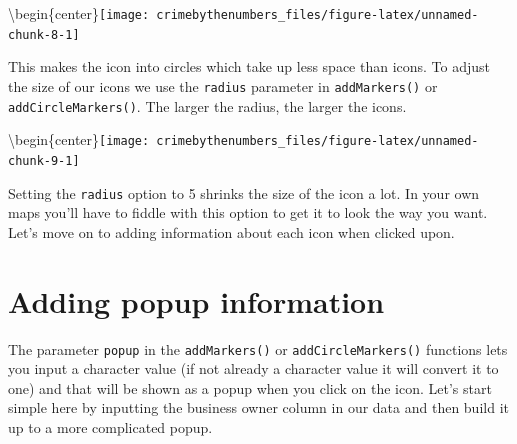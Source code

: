 \documentclass[
  12pt,
  openany]{book}
\newenvironment{Shaded}{\begin{snugshade}}{\end{snugshade}}
\newcommand{\AttributeTok}[1]{\textcolor[rgb]{0.61,0.61,0.61}{#1}}
\newcommand{\DecValTok}[1]{\textcolor[rgb]{0.06,0.06,0.06}{#1}}
\newcommand{\FunctionTok}[1]{\textcolor[rgb]{0,0,0}{#1}}
\newcommand{\NormalTok}[1]{#1}
\newcommand{\SpecialCharTok}[1]{\textcolor[rgb]{0,0,0}{#1}}
\newcommand{\StringTok}[1]{\textcolor[rgb]{0.5,0.5,0.5}{#1}}
\begin{document}
\textbackslash begin\{center\}\texttt{[image: crimebythenumbers\_files/figure-latex/unnamed-chunk-8-1]}

This makes the icon into circles which take up less space than icons. To adjust the size of our icons we use the \texttt{radius} parameter in \texttt{addMarkers()} or \texttt{addCircleMarkers()}. The larger the radius, the larger the icons.

\begin{Shaded}
\end{Shaded}

\textbackslash begin\{center\}\texttt{[image: crimebythenumbers\_files/figure-latex/unnamed-chunk-9-1]}

Setting the \texttt{radius} option to 5 shrinks the size of the icon a lot. In your own maps you'll have to fiddle with this option to get it to look the way you want. Let's move on to adding information about each icon when clicked upon.

\hypertarget{adding-popup-information}{%
\section{Adding popup information}\label{adding-popup-information}}

The parameter \texttt{popup} in the \texttt{addMarkers()} or \texttt{addCircleMarkers()} functions lets you input a character value (if not already a character value it will convert it to one) and that will be shown as a popup when you click on the icon. Let's start simple here by inputting the business owner column in our data and then build it up to a more complicated popup.
\end{document}
